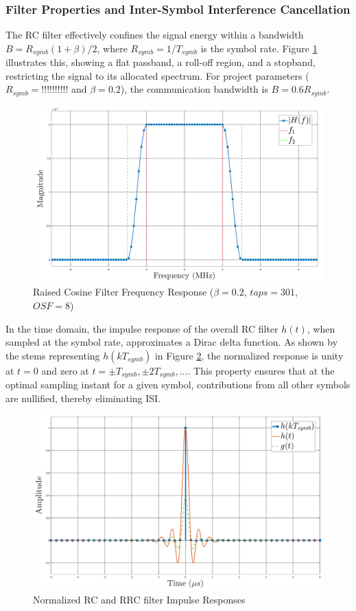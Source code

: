 \subsubsection{Filter Properties and Inter-Symbol Interference Cancellation}
The RC filter effectively confines the signal energy within a bandwidth $B = R_{symb} (1+\beta)/2$, where $R_{symb} = 1/T_{symb}$ is the symbol rate. Figure \ref{fig:h-rc-freq} illustrates this, showing a flat passband, a roll-off region, and a stopband, restricting the signal to its allocated spectrum. For project parameters ($R_{symb} = !!!!!!!!!!$ and $\beta = 0.2$), the communication bandwidth is $B = 0.6 R_{symb}$.

\begin{figure}[H]
	\centering
	\includegraphics[width=0.9\linewidth]{Images/h-rc-freq} %
	\caption{Raised Cosine Filter Frequency Response ($\beta = 0.2$, $taps = 301$, $OSF = 8$)}
	\label{fig:h-rc-freq}
\end{figure}

In the time domain, the impulse response of the overall RC filter $h(t)$, when sampled at the symbol rate, approximates a Dirac delta function. As shown by the stems representing $h(kT_{symb})$ in Figure \ref{fig:h-rc}, the normalized response is unity at $t=0$ and zero at $t = \pm T_{symb}, \pm 2T_{symb}, \dots$. This property ensures that at the optimal sampling instant for a given symbol, contributions from all other symbols are nullified, thereby eliminating ISI.

\begin{figure}[H]
	\centering
	\includegraphics[width=0.9\linewidth]{Images/h-rc} %
	\caption{Normalized RC and RRC filter Impulse Responses}
	\label{fig:h-rc}
\end{figure}

